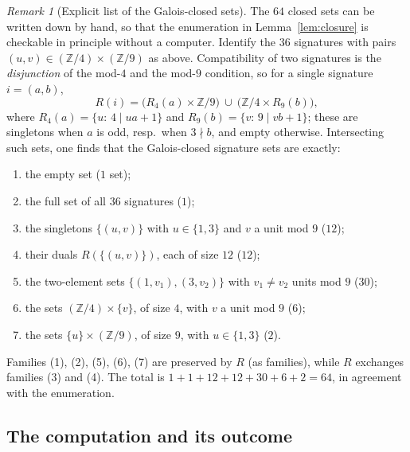 \documentclass[11pt,a4paper]{article}
\theoremstyle{plain}
\theoremstyle{definition}
\theoremstyle{remark}
\newtheorem{remark}[theorem]{Remark}
\newcommand{\Z}{\mathbb{Z}}
\begin{document}
\begin{remark}[Explicit list of the Galois-closed sets]\label{rem:closedlist}
The $64$ closed sets can be written down by hand, so that the enumeration in
Lemma~\ref{lem:closure} is checkable in principle without a computer. Identify the $36$ signatures
with pairs $(u,v)\in(\Z/4)\times(\Z/9)$ as above. Compatibility of two
signatures is the \emph{disjunction} of the mod-$4$ and the mod-$9$ condition, so for a single
signature $i=(a,b)$,
\[
 R(i)=\bigl(R_4(a)\times \Z/9\bigr)\ \cup\ \bigl(\Z/4\times R_9(b)\bigr),
\]
where $R_4(a)=\{u:\,4\mid ua+1\}$ and $R_9(b)=\{v:\,9\mid vb+1\}$; these are singletons when $a$ is
odd, resp.\ when $3\nmid b$, and empty otherwise. Intersecting such sets, one finds that the Galois-closed
signature sets are exactly:
\begin{enumerate}
\item the empty set \hfill($1$ set);
\item the full set of all $36$ signatures \hfill($1$);
\item the singletons $\{(u,v)\}$ with $u\in\{1,3\}$ and $v$ a unit mod $9$ \hfill($12$);
\item their duals $R(\{(u,v)\})$, each of size $12$ \hfill($12$);
\item the two-element sets $\{(1,v_1),(3,v_2)\}$ with $v_1\neq v_2$ units mod $9$ \hfill($30$);
\item the sets $(\Z/4)\times\{v\}$, of size $4$, with $v$ a unit mod $9$ \hfill($6$);
\item the sets $\{u\}\times(\Z/9)$, of size $9$, with $u\in\{1,3\}$ \hfill($2$).
\end{enumerate}
Families (1), (2), (5), (6), (7) are preserved by $R$ (as families), while $R$ exchanges families (3) and (4).
The total is $1+1+12+12+30+6+2=64$, in agreement with the enumeration.
\end{remark}


\subsection{The computation and its outcome}
\end{document}
